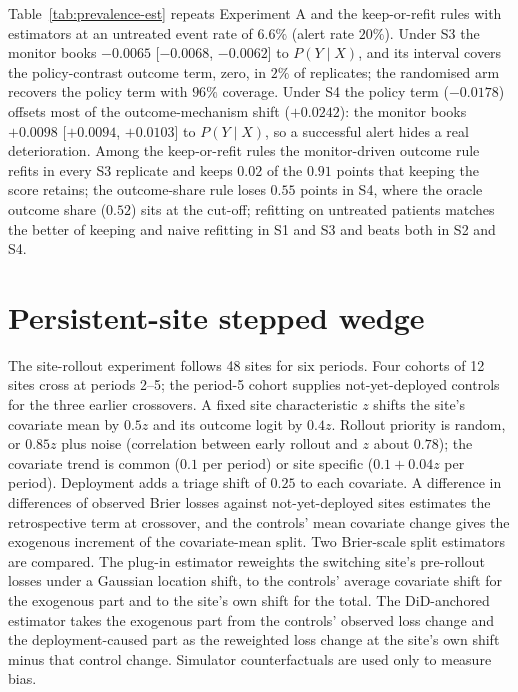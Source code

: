\documentclass[letterpaper]{article} %
\begin{document}

Table~\ref{tab:prevalence-est} repeats Experiment A and the keep-or-refit rules with estimators at an
untreated event rate of $6.6\%$ (alert rate $20\%$). Under S3 the monitor
books $-0.0065$ [$-0.0068$, $-0.0062$] to $P(Y \mid X)$, and its interval
covers the policy-contrast outcome term, zero, in $2\%$ of replicates; the
randomised arm recovers the policy term with $96\%$ coverage. Under S4 the
policy term ($-0.0178$) offsets most of the outcome-mechanism shift
($+0.0242$): the monitor books $+0.0098$ [$+0.0094$, $+0.0103$] to
$P(Y \mid X)$, so a successful alert hides a real deterioration. Among the keep-or-refit rules the
monitor-driven outcome rule refits in every S3 replicate and keeps $0.02$ of
the $0.91$ points that keeping the score retains; the outcome-share rule
loses $0.55$ points in S4, where the oracle outcome share ($0.52$) sits at the
cut-off; refitting on untreated patients matches the better of keeping and
naive refitting in S1 and S3 and beats both in S2 and S4.



\section{Persistent-site stepped wedge}
\label{app:sites}
The site-rollout experiment follows 48 sites for six periods. Four cohorts of 12 sites cross
at periods 2--5; the period-5 cohort supplies not-yet-deployed controls for the
three earlier crossovers. A fixed site characteristic $z$ shifts the site's
covariate mean by $0.5z$ and its outcome logit by $0.4z$. Rollout priority is
random, or $0.85z$ plus noise (correlation between early rollout and $z$ about
$0.78$); the covariate trend is common ($0.1$ per period) or site specific
($0.1 + 0.04z$ per period). Deployment adds a triage shift of $0.25$ to each
covariate. A difference in differences of observed Brier losses against
not-yet-deployed sites estimates the retrospective term at crossover, and the
controls' mean covariate change gives the exogenous increment of the
covariate-mean split. Two Brier-scale split estimators are compared. The
plug-in estimator reweights the switching site's pre-rollout losses under a
Gaussian location shift, to the controls' average covariate shift for the
exogenous part and to the site's own shift for the total. The DiD-anchored
estimator takes the exogenous part from the controls' observed loss change
and the deployment-caused part as the reweighted loss change at the site's
own shift minus that control change. Simulator counterfactuals are used only
to measure bias.
\end{document}
